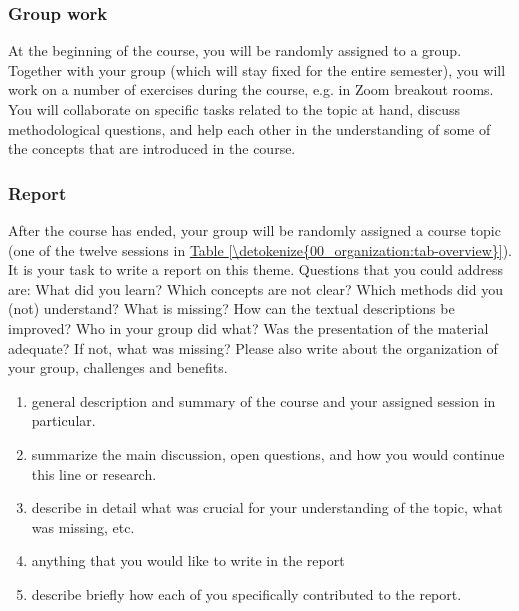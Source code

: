 \documentclass[letterpaper,10pt,english]{sphinxmanual}
\begin{document}
\subsubsection*{Group work}

At the beginning of the course, you will be randomly assigned to a group.
Together with your group (which will stay fixed for the entire semester),
you will work on a number of exercises during the course, e.g. in Zoom breakout rooms.
You will collaborate on specific tasks related to the topic at hand, discuss methodological questions,
and help each other in the understanding of some of the concepts that are introduced in the course.
\subsubsection*{Report}

After the course has ended, your group will be randomly assigned a course topic (one of the twelve sessions in \hyperref[\detokenize{00_organization:tab-overview}]{Table \ref{\detokenize{00_organization:tab-overview}}}).
It is your task to write a report on this theme. Questions that you could address are:
What did you learn? Which concepts are not clear? Which methods did you (not) understand?
What is missing? How can the textual descriptions be improved? Who in your group did what?
Was the presentation of the material adequate? If not, what was missing?
Please also write about the organization of your group, challenges and benefits.

\begin{enumerate}
%
\item {} 
 general description and summary of the course and your assigned session in particular.

\item {} 
 summarize the main discussion, open questions, and how you would continue this line or research.

\item {} 
 describe in detail what was crucial for your understanding of the topic, what was missing, etc.

\item {} 
 anything that you would like to write in the report

\item {} 
 describe briefly how each of you specifically contributed to the report.

\end{enumerate}
\end{document}
